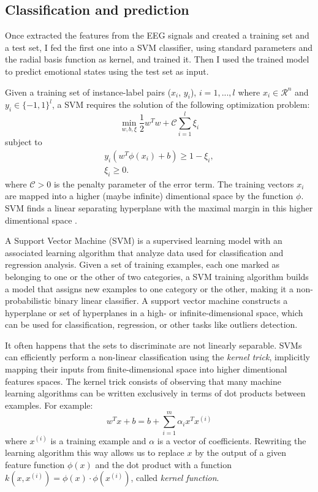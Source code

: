 \documentclass[10pt,journal,A4paper,compsoc,epsfig]{IEEEtran}
\begin{document}
\subsection{Classification and prediction}

Once extracted the features from the EEG signals and created a training set and a test set, I fed the first one into a SVM classifier, using standard parameters and the radial basis function as kernel, and trained it. Then I used the trained model to predict emotional states using the test set as input.

Given a training set of instance-label pairs ($x_i$, $y_i$), $i= 1, ..., l$ where $x_i \in \mathcal{R}^n$ and  $y_i \in \{-1, 1\}^l$, a SVM requires the solution of the following optimization problem:
\begin{equation}
\min_{w,b,\xi}{\frac{1}{2}w^Tw + \mathcal{C}\sum_{i=1}^l{\xi_i}}
\end{equation}
subject to
\begin{eqnarray}
y_i(w^T\phi(x_i)+b)\geq 1-\xi_i, \\
\xi_i \geq 0.
\end{eqnarray}
where $\mathcal{C} > 0$ is the penalty parameter of the error term. The training vectors $x_i$ are mapped into a higher (maybe infinite) dimentional space by the function $\phi$. SVM finds a linear separating hyperplane with the maximal margin in this higher dimentional space \cite{hsu2003practical}.

A Support Vector Machine (SVM) is a supervised learning model with an associated learning algorithm that analyze data used for classification and regression analysis. Given a set of training examples, each one marked as belonging to one or the other of two categories, a SVM training algorithm builds a model that assigns new examples to one category or the other, making it a non-probabilistic binary linear classifier.
A support vector machine constructs a hyperplane or set of hyperplanes	 in a high- or infinite-dimensional space, which can be used for classification, regression, or other tasks like outliers detection.

It often happens that the sets to discriminate are not linearly separable. SVMs can efficiently perform a non-linear classification using the \textit{kernel trick}, implicitly mapping their inputs from finite-dimensional space into higher dimentional features spaces. The kernel trick consists of observing that many machine learning algorithms can be written exclusively in terms of dot products between examples. For example:
\begin{equation}
w^Tx + b = b + \sum_{i=1}^m {\alpha_ix^Tx^{(i)}}
\end{equation}
where $x^{(i)}$ is a training example and $\alpha$ is a vector of coefficients. Rewriting the learning algorithm this way allows us to replace $x$ by the output of a given feature function $\phi(x)$ and the dot product with a function $k(x, x^{(i)}) = \phi(x)\cdot\phi(x^{(i)})$, called \textit{kernel function}.
\end{document}
